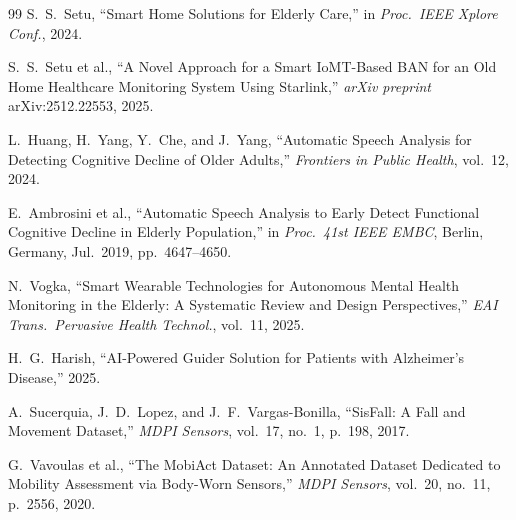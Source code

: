\documentclass[conference]{IEEEtran}
\begin{document}
\begin{thebibliography}{99}
S.~S.~Setu, ``Smart Home Solutions for Elderly Care,'' in \textit{Proc.\
IEEE Xplore Conf.}, 2024.

S.~S.~Setu et al., ``A Novel Approach for a Smart IoMT-Based BAN for an
Old Home Healthcare Monitoring System Using Starlink,'' \textit{arXiv
preprint} arXiv:2512.22553, 2025.

L.~Huang, H.~Yang, Y.~Che, and J.~Yang, ``Automatic Speech Analysis for
Detecting Cognitive Decline of Older Adults,'' \textit{Frontiers in Public
Health}, vol.~12, 2024.

E.~Ambrosini et al., ``Automatic Speech Analysis to Early Detect Functional
Cognitive Decline in Elderly Population,'' in \textit{Proc.\ 41st IEEE
EMBC}, Berlin, Germany, Jul.~2019, pp.~4647--4650.

N.~Vogka, ``Smart Wearable Technologies for Autonomous Mental Health
Monitoring in the Elderly: A Systematic Review and Design Perspectives,''
\textit{EAI Trans.\ Pervasive Health Technol.}, vol.~11, 2025.

H.~G.~Harish, ``AI-Powered Guider Solution for Patients with Alzheimer's
Disease,'' 2025.

A.~Sucerquia, J.~D.~Lopez, and J.~F.~Vargas-Bonilla, ``SisFall: A Fall and
Movement Dataset,'' \textit{MDPI Sensors}, vol.~17, no.~1, p.~198, 2017.

G.~Vavoulas et al., ``The MobiAct Dataset: An Annotated Dataset Dedicated
to Mobility Assessment via Body-Worn Sensors,'' \textit{MDPI Sensors},
vol.~20, no.~11, p.~2556, 2020.

\end{thebibliography}
\end{document}
